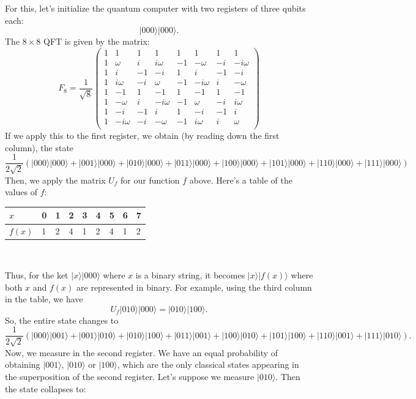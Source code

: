 \documentclass{article}
\theoremstyle{plain}
\theoremstyle{definition}
\theoremstyle{remark}
\numberwithin{theorem}{section}
\begin{document}
 For this, let's initialize the quantum computer with two registers of three qubits each:
 \[
 | 000\rangle |000 \rangle.
 \]
 The $8 \times 8$ QFT is given by the matrix:
	\[
					F_8 = \frac{1}{\sqrt{8}}
					\begin{pmatrix}
						1 & 1 & 1 & 1 & 1 & 1 & 1 & 1 \\
						1 & \omega & i & i\omega & -1 & -\omega & -i & -i\omega \\
						1 & i & -1 & -i & 1 & i & -1 & -i \\
						1 & i\omega & -i & \omega & -1 & -i\omega & i & -\omega \\
						1 & -1 & 1 & -1 & 1 & -1 & 1 & -1 \\
						1 & -\omega & i & -i\omega & -1 & \omega & -i & i\omega \\
						1 & -i & -1 & i & 1 & -i & -1 & i \\
						1 & -i\omega & -i & -\omega & -1 & i\omega & i & \omega \\
					\end{pmatrix}
					\]
If we apply this to the first register, we obtain (by reading down the first column), the state
\[
 \frac{1}{2\sqrt{2}}\left(
 |000\rangle |000\rangle + 
 |001\rangle |000\rangle +
 |010\rangle |000\rangle +
 |011\rangle |000\rangle +
 |100\rangle |000\rangle +
 |101\rangle |000\rangle +
 |110\rangle |000\rangle +
 |111\rangle |000\rangle \right)
\]
Then, we apply the matrix $U_f$ for our function $f$ above.  Here's a table of the values of $f$:\\
\begin{center}
\begin{tabular}{l|llllllll}
$x$ & 0 & 1 & 2 & 3 & 4 & 5 & 6 & 7 \\
\hline
$f(x)$ & 1 & 2 & 4 & 1 & 2 & 4 & 1 & 2 \\
\end{tabular}\\
\end{center}
Thus, for the ket $|x \rangle | 000\rangle$ where $x$ is a binary string, it becomes $|x\rangle |f(x) \rangle$ where both $x$ and $f(x)$ are represented in binary.  For example, using the third column in the table, we have
\[
U_f | 010 \rangle |000\rangle = |010\rangle |100\rangle.
\]
So, the entire state changes to
 \[
 \frac{1}{2\sqrt{2}}\left(
 |000\rangle |001\rangle + 
 |001\rangle |010\rangle +
 |010\rangle |100\rangle +
 |011\rangle |001\rangle +
 |100\rangle |010\rangle +
 |101\rangle |100\rangle +
 |110\rangle |001\rangle +
 |111\rangle |010\rangle \right).
 \]
 Now, we measure in the second register.  We have an equal probability of obtaining $|001\rangle$, $|010\rangle$ or $|100\rangle$, which are the only classical states appearing in the superposition of the second register.  Let's suppose we measure $|010\rangle$.  Then the state collapses to:
\end{document}
